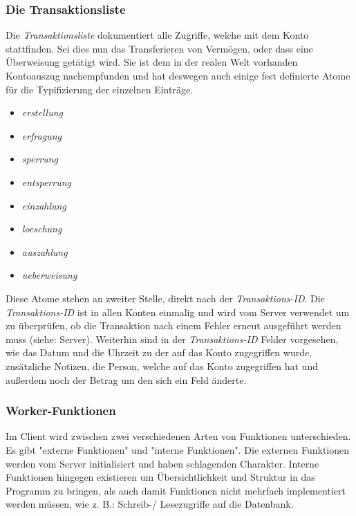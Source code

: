 \subsubsection{Die Transaktionsliste}
Die \textit{Transaktionsliste} dokumentiert alle Zugriffe, welche mit dem Konto stattfinden. Sei dies nun das Transferieren von Vermögen, oder dass eine Überweisung getätigt wird. Sie ist dem in der realen Welt vorhanden Kontoauszug nachempfunden und hat deswegen auch einige fest definierte Atome für die Typifizierung der einzelnen Einträge.
\begin{itemize}
\item \textit{erstellung}
\item \textit{erfragung}
\item \textit{sperrung}
\item \textit{entsperrung}
\item \textit{einzahlung}
\item \textit{loeschung}
\item \textit{auszahlung}
\item \textit{ueberweisung}
\end{itemize}
Diese Atome stehen an zweiter Stelle, direkt nach der \textit{Transaktions-ID}. Die \textit{Transaktions-ID} ist in allen Konten einmalig und wird vom Server verwendet um zu überprüfen, ob die Transaktion nach einem Fehler erneut ausgeführt werden muss (siehe: Server). Weiterhin sind in der \textit{Transaktions-ID} Felder vorgesehen, wie das Datum und die Uhrzeit zu der auf das Konto zugegriffen wurde, zusätzliche Notizen, die Person, welche auf das Konto zugegriffen hat und außerdem noch der Betrag um den sich ein Feld änderte. 
\subsubsection{Worker-Funktionen}
Im Client wird zwischen zwei verschiedenen Arten von Funktionen unterschieden. Es gibt "externe Funktionen" und "interne Funktionen". Die externen Funktionen werden vom Server initialisiert und haben schlagenden Charakter. Interne Funktionen hingegen existieren um Übersichtlichkeit und Struktur in das Programm zu bringen, als auch damit Funktionen nicht mehrfach implementiert werden müssen, wie z. B.: Schreib-/ Lesezugriffe auf die Datenbank.

